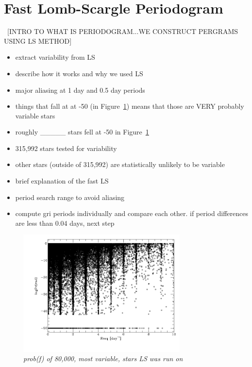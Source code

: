 \documentclass[aps,prb,twocolumn,superscriptaddress]{revtex4-1}
\begin{document}
\section{Fast Lomb-Scargle Periodogram}

~[INTRO TO WHAT IS PERIODOGRAM...WE CONSTRUCT PERGRAMS USING LS METHOD]
\begin{itemize}
	\item{} extract variability from LS
	\item{} describe how it works and why we used LS
	\item{} major aliasing at 1 day and 0.5 day periods
	\item{} things that fall at at -50 (in Figure~\ref{fig:quartiles}) means that those are VERY probably variable stars
	\item{} roughly \_\_\_\_\_ stars fell at -50 in Figure~\ref{fig:quartiles}
	\item{} 315,992 stars tested for variability
	\item{} other stars (outside of 315,992) are statistically unlikely to be variable
\end{itemize}

\begin{itemize}
	\item{} brief explanation of the fast LS
	\item{} period search range to avoid aliasing
	\item{} compute gri periods individually and compare each other. if period differences are less than 0.04 days, next step
\end{itemize}



\begin{figure}[H]
 \centering
 	\includegraphics[width=3.35in]{figures/fromJT/probf.png}
 \caption{\it \small{prob(f) of 80,000, most variable, stars LS was run on}}
 \label{fig:quartiles}
\end{figure}
\end{document}

